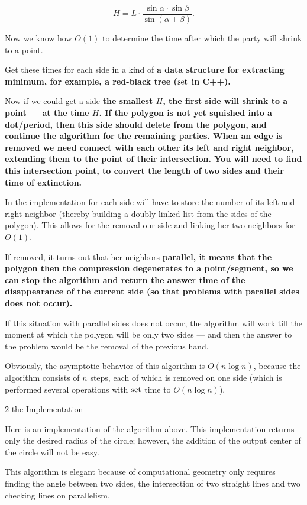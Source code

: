 $$ H = L \cdot \frac{ \sin \alpha \cdot \sin \beta }{ \sin (\alpha + \beta) }. $$

Now we know how $O(1)$ to determine the time after which the party will shrink to a point.

Get these times for each side in a kind of \bf{a data structure for extracting minimum}, for example, a red-black tree ($\rm set$ in C++).

Now if we could get a side \bf{the smallest $H$}, the first side will shrink to a point --- at the time $H$. If the polygon is not yet squished into a dot/period, then this side should \bf{delete} from the polygon, and continue the algorithm for the remaining parties. When an edge is removed we need \bf{connect} with each other its left and right neighbor, \bf{extending} them to the point of their intersection. You will need to find this intersection point, to convert the length of two sides and their time of extinction.

In the implementation for each side will have to store the number of its left and right neighbor (thereby building a doubly linked list from the sides of the polygon). This allows for the removal our side and linking her two neighbors for $O(1)$.

If removed, it turns out that her neighbors \bf{parallel}, it means that the polygon then the compression degenerates to a point/segment, so we can stop the algorithm and return the answer time of the disappearance of the current side (so that problems with parallel sides does not occur).

If this situation with parallel sides does not occur, the algorithm will work till the moment at which the polygon will be only two sides --- and then the answer to the problem would be the removal of the previous hand.

Obviously, the asymptotic behavior of this algorithm is $O (n \log n)$, because the algorithm consists of $n$ steps, each of which is removed on one side (which is performed several operations with $\rm set$ time to $O (n \log n)$).


\h2{ the Implementation }

Here is an implementation of the algorithm above. This implementation returns only the desired radius of the circle; however, the addition of the output center of the circle will not be easy.

This algorithm is elegant because of computational geometry only requires finding the angle between two sides, the intersection of two straight lines and two checking lines on parallelism.

